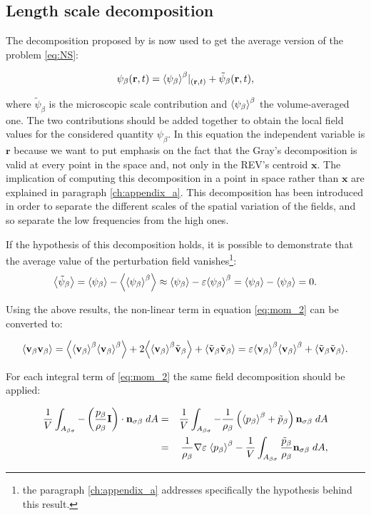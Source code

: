 \subsection{Length scale decomposition}

The decomposition proposed by \citet{gray1975derivation} is now used to get the average version of the problem \eqref{eq:NS}:

\begin{equation}
\psi_{\beta}(\mathbf{r},t) = {\left< \psi_{\beta} \right>}^{\beta}|_{(\mathbf{r},t)} + \tilde{\psi}_{\beta}(\mathbf{r},t),
\label{eq:gray}
\end{equation}

\noindent where $\tilde{\psi}_{\beta}$ is the microscopic scale contribution and $ {\left< \psi_{\beta} \right>}^{\beta}$ the volume-averaged one. The two contributions should be added together to obtain the local field values for the considered quantity $\psi_{\beta}$.
In this equation the independent variable is $\mathbf{r}$ because we want to put emphasis on the fact that the Gray's decomposition is valid at every point in the space and, not only in the REV's centroid $\mathbf{x}$. The implication of computing this decomposition in a point in space rather than $\mathbf{x}$ are explained in paragraph \ref{ch:appendix_a}.
This decomposition has been introduced in order to separate the different scales of the spatial variation of the fields, and so separate the low frequencies from the high ones.

If the hypothesis of this decomposition holds, it is possible to demonstrate that the average value of the perturbation field vanishes\footnote{the paragraph \ref{ch:appendix_a} addresses specifically the hypothesis behind this result.}:
$$
{\left< \tilde{\psi}_{\beta} \right>} = {\left< \psi_{\beta} \right>} - {\left< {\left< \psi_{\beta} \right>}^{\beta} \right>} \approx {\left< \psi_{\beta} \right>} -\varepsilon {\left< \psi_{\beta} \right>}^{\beta} = {\left< \psi_{\beta} \right>} -{\left< \psi_{\beta} \right>} = 0.
$$


Using the above results, the non-linear term in equation \eqref{eq:mom_2} can be converted to:

\begin{equation}
{\left< \textbf{v}_{\beta}\textbf{v}_{\beta}\right>} = {\left< {\left< \textbf{v}_{\beta} \right>}^{\beta}{\left< \textbf{v}_{\beta} \right>}^{\beta} \right>} +2{\left< {\left< \textbf{v}_{\beta} \right>}^{\beta}\tilde{\textbf{v}}_{\beta} \right>} +{\left< \tilde{\textbf{v}}_{\beta} \tilde{\textbf{v}}_{\beta} \right>} = \varepsilon {\left< \textbf{v}_{\beta}\right>}^{\beta}{\left< \textbf{v}_{\beta} \right>}^{\beta} +{\left< \tilde{\textbf{v}}_{\beta}\tilde{\textbf{v}}_{\beta} \right>}.
\label{eq:dec_1}
\end{equation}

For each integral term of \eqref{eq:mom_2} the same field decomposition should be applied:

\begin{eqnarray}
\dfrac{1}{V} \int_{A_{\beta \sigma}}  - \left( \dfrac{p_{\beta}}{\rho_{\beta}} \mathbf{I} \right) \cdot \mathbf{n}_{\sigma \beta} \;dA &=& \dfrac{1}{V} \int_{A_{\beta \sigma}}  -\dfrac{1}{\rho_{\beta}} \left({\left< p_{\beta} \right>}^{\beta}   + \tilde{p}_{\beta} \right)  \mathbf{n}_{\sigma \beta} \;dA  \nonumber \\
&=& \dfrac{1}{\rho_{\beta}}\nabla\varepsilon \; {\left< p_{\beta} \right>}^{\beta} - \dfrac{1}{V} \int_{A_{\beta \sigma}}  \dfrac{\tilde{p}_{\beta}}{\rho_{\beta}}  \mathbf{n}_{\sigma \beta} \;dA,
\end{eqnarray}


